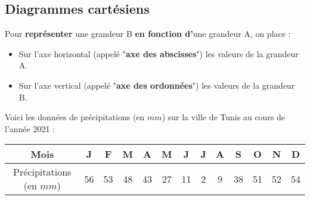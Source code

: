 \begin{pageCours}

\section{Diagrammes cartésiens}

\begin{Def}
Pour \textbf{représenter} une grandeur B \textbf{en fonction d'}une grandeur A, on place :
\begin{itemize}
\item Sur l'axe horizontal (appelé "\textbf{axe des abscisses}") les valeurs de la grandeur A.
\item Sur l'axe vertical (appelé "\textbf{axe des ordonnées}") les valeurs de la grandeur B.
\end{itemize}
\end{Def}

\begin{Ex}
Voici les données de précipitations (en $mm$) sur la ville de Tunis au cours de l'année 2021 : 
\begin{center}
\begin{tabular}{c|c|c|c|c|c|c|c|c|c|c|c|c}
Mois & J & F & M & A & M & J & J & A & S & O & N & D \\\hline
Précipitations (en $mm$) & 56 & 53 & 48 & 43 & 27 & 11 & 2 & 9 & 38 & 51 & 52 & 54 \\
\end{tabular}
\end{center}
\end{Ex}

\end{pageCours}




\begin{pageAD}



 


 


\end{pageAD}



